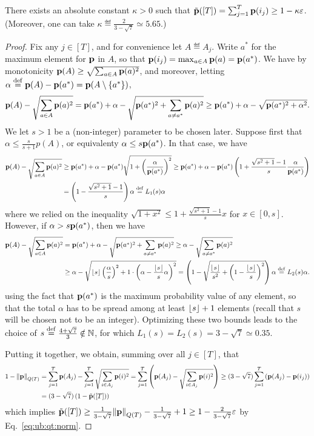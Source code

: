 \begin{lemma}\label{lemma:ub:key}
  There exists an absolute constant $\kappa>0$ such that $\tilde{\mathbf{p}}([T]) =\sum_{j=1}^T \mathbf{p}(i_j) \geq 1-\kappa\varepsilon$. (Moreover, one can take $\kappa\eqdef \frac{2}{3-\sqrt{7}} \simeq 5.65$.)
\end{lemma}
\begin{proof}
Fix any $j\in[T]$, and for convenience let $A\eqdef A_j$. Write $a^\ast$ for the maximum element for $\mathbf{p}$ in $A$, so that $\mathbf{p}(i_j)=\max_{a\in A} \mathbf{p}(a) = \mathbf{p}(a^\ast)$. We have by monotonicity $\mathbf{p}(A) \geq \sqrt{\sum_{a\in A} \mathbf{p}(a)^2}$, and moreover, letting $\alpha \stackrel{\rm def}{=} \mathbf{p}(A)-\mathbf{p}(a^\ast) = \mathbf{p}(A\setminus\{a^\ast\})$,
\[
  \mathbf{p}(A) - \sqrt{\sum_{a\in A} \mathbf{p}(a)^2}
  = \mathbf{p}(a^\ast) + \alpha - \sqrt{\mathbf{p}(a^\ast)^2+\sum_{a\neq a^\ast} \mathbf{p}(a)^2}
  \geq \mathbf{p}(a^\ast) + \alpha - \sqrt{\mathbf{p}(a^\ast)^2+\alpha^2}.
\]
We let $s>1$ be a (non-integer) parameter to be chosen later. Suppose first that $\alpha \leq \frac{s}{s+1}p(A)$, or equivalenty $\alpha \leq s \mathbf{p}(a^\ast)$. In that case, we have
\begin{align*}
  \mathbf{p}(A) - \sqrt{\sum_{a\in A} \mathbf{p}(a)^2}
&\geq \mathbf{p}(a^\ast) + \alpha - \mathbf{p}(a^\ast)\sqrt{1+\left(\frac{\alpha}{\mathbf{p}(a^\ast)}\right)^2}
\geq \mathbf{p}(a^\ast) + \alpha - \mathbf{p}(a^\ast)\left(1+\frac{\sqrt{s^2+1}-1}{s}\frac{\alpha}{\mathbf{p}(a^\ast)}\right) \\
&= \left(1-\frac{\sqrt{s^2+1}-1}{s}\right)\alpha \stackrel{\rm def}{=} L_1(s)\alpha
\end{align*}
where we relied on the inequality $\sqrt{1+x^2} \leq 1+\frac{\sqrt{s^2+1}-1}{s}x$ for $x\in[0,s]$. 
However, if $\alpha >  s \mathbf{p}(a^\ast)$, then we have
\begin{align*}
  \mathbf{p}(A) - \sqrt{\sum_{a\in A} \mathbf{p}(a)^2}
  &= \mathbf{p}(a^\ast) + \alpha - \sqrt{\mathbf{p}(a^\ast)^2+\sum_{a\neq a^\ast} \mathbf{p}(a)^2}
  \geq \alpha - \sqrt{\sum_{a\neq a^\ast} \mathbf{p}(a)^2} \\
  &\geq \alpha - \sqrt{\left\lfloor s \right\rfloor\left(\frac{\alpha}{s}\right)^2+1\cdot\left(\alpha-\frac{\left\lfloor s \right\rfloor}{s}\alpha\right)^2} 
  = \left(1-\sqrt{\frac{\left\lfloor s \right\rfloor}{s^2}+\left(1-\frac{\left\lfloor s \right\rfloor}{s}\right)^2} \right)\alpha \stackrel{\rm def}{=} L_2(s)\alpha.
\end{align*}
using the fact that $\mathbf{p}(a^\ast)$ is the maximum probability value of any element, so that the total $\alpha$ has to be spread among at least $\left\lfloor s \right\rfloor+1$ elements (recall that $s$ will be chosen not to be an integer). Optimizing these two bounds leads to the choice of $s\stackrel{\rm def}{=} \frac{4+\sqrt{7}}{3} \notin\mathbb{N}$, for which 
$L_1(s)= L_2(s) = 3-\sqrt{7}\simeq 0.35$.

Putting it together, we obtain, summing over all $j\in[T]$, that
\begin{align*}
    1 - \lVert\mathbf{p}{\rVert}_{Q(T)} &=  \sum_{j=1}^T \mathbf{p}(A_j) - \sum_{j=1}^T \sqrt{ \sum_{i\in A_j} \mathbf{p}(i)^2 }
    =  \sum_{j=1}^T \left( \mathbf{p}(A_j) - \sqrt{\sum_{i\in A_j} \mathbf{p}(i)^2} \right)
    \geq  (3-\sqrt{7})\sum_{j=1}^T \left( \mathbf{p}(A_j) - \mathbf{p}(i_j) \right) \\
    &= (3-\sqrt{7})\left(1 - \tilde{\mathbf{p}}([T]) \right)
\end{align*}
which implies $\tilde{\mathbf{p}}([T]) \geq \frac{1}{3-\sqrt{7}}\lVert\mathbf{p}{\rVert}_{Q(T)} - \frac{1}{3-\sqrt{7}}+1 \geq 1 - \frac{2}{3-\sqrt{7}}\varepsilon$ by Eq.~\eqref{eq:ub:qt:norm}.
\end{proof}

